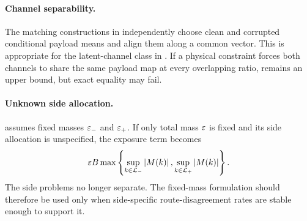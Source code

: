 \paragraph{Channel separability.}
The matching constructions in  independently choose clean and corrupted conditional payload means and align them along a common vector. This is appropriate for the latent-channel class in . If a physical constraint forces both channels to share the same payload map at every overlapping ratio,  remains an upper bound, but exact equality may fail.

\paragraph{Unknown side allocation.}
 assumes fixed masses $\varepsilon_-$ and $\varepsilon_+$. If only total mass $\varepsilon$ is fixed and its side allocation is unspecified, the exposure term becomes
\begin{equation}
\varepsilon B\max\left\{\sup_{k\in\mathcal{L}_-}\left\lvert M(k) \right\rvert,\sup_{k\in\mathcal{L}_+}\left\lvert M(k) \right\rvert\right\}.
\end{equation}
The side problems no longer separate. The fixed-mass formulation should therefore be used only when side-specific route-disagreement rates are stable enough to support it.